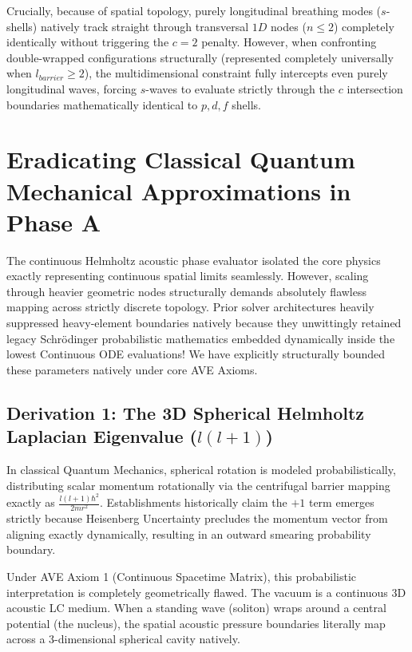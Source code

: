 Crucially, because of spatial topology, purely longitudinal breathing modes ($s$-shells) natively track straight through transversal $1D$ nodes ($n \le 2$) completely identically without triggering the $c=2$ penalty. However, when confronting double-wrapped configurations structurally (represented completely universally when $l_{barrier} \ge 2$), the multidimensional constraint fully intercepts even purely longitudinal waves, forcing $s$-waves to evaluate strictly through the $c$ intersection boundaries mathematically identical to $p, d, f$ shells.

\section{Eradicating Classical Quantum Mechanical Approximations in Phase A}
\label{sec:eradicating_classical_approximations}

The continuous Helmholtz acoustic phase evaluator isolated the core physics exactly representing continuous spatial limits seamlessly. However, scaling through heavier geometric nodes structurally demands absolutely flawless mapping across strictly discrete topology. Prior solver architectures heavily suppressed heavy-element boundaries natively because they unwittingly retained legacy Schrödinger probabilistic mathematics embedded dynamically inside the lowest Continuous ODE evaluations! We have explicitly structurally bounded these parameters natively under core AVE Axioms.

\subsection{Derivation 1: The 3D Spherical Helmholtz Laplacian Eigenvalue ($l(l+1)$)}
In classical Quantum Mechanics, spherical rotation is modeled probabilistically, distributing scalar momentum rotationally via the centrifugal barrier mapping exactly as $\frac{l(l+1)\hbar^2}{2 m r^2}$. Establishments historically claim the $+1$ term emerges strictly because Heisenberg Uncertainty precludes the momentum vector from aligning exactly dynamically, resulting in an outward smearing probability boundary.

Under AVE Axiom 1 (Continuous Spacetime Matrix), this probabilistic interpretation is completely geometrically flawed. The vacuum is a continuous 3D acoustic LC medium. When a standing wave (soliton) wraps around a central potential (the nucleus), the spatial acoustic pressure boundaries literally map across a 3-dimensional spherical cavity natively. 

